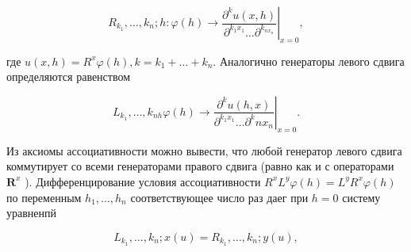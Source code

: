 \documentclass[10pt]{article}
\begin{document}
\[

R_{k_{1}}, \ldots, k_{n} ; h:\left.\varphi(h) \rightarrow \frac{\partial^{k} u(x, h)}{\partial^{k_{1} x_{1}} \ldots \partial^{k_{n x_{n}}}}\right|_{x=0},

\]



где $u(x, h)=R^{x} \varphi(h), k=k_{1}+\ldots+k_{n}$. Аналогично генераторы левого сдвига определяются равенством



\[

L_{k_{1}}, \ldots,\left.k_{n h} \varphi(h) \rightarrow \frac{\partial^{k} u(h, x)}{\partial^{k_{1} x_{1}} \ldots \partial^{k} n x_{n}}\right|_{x=0} .

\]



Из аксиомы ассоциативности можно вывести, что любой генератор левого сдвига коммутирует со всеми генераторами правого сдвига (равно как и с операторами $\boldsymbol{R}^{x}$ ). Дифференцирование условия ассоциативности $R^{x} L^{y} \varphi(h)=L^{y} R^{x} \varphi(h)$ по переменным $h_{1}, \ldots, h_{n}$ соответствующее число раз даег при $h=0$ систему уравненпй



\[

L_{k_{1}}, \ldots, k_{n} ; x(u)=R_{k_{1}}, \ldots, k_{n} ; y(u),

\]
\end{document}
